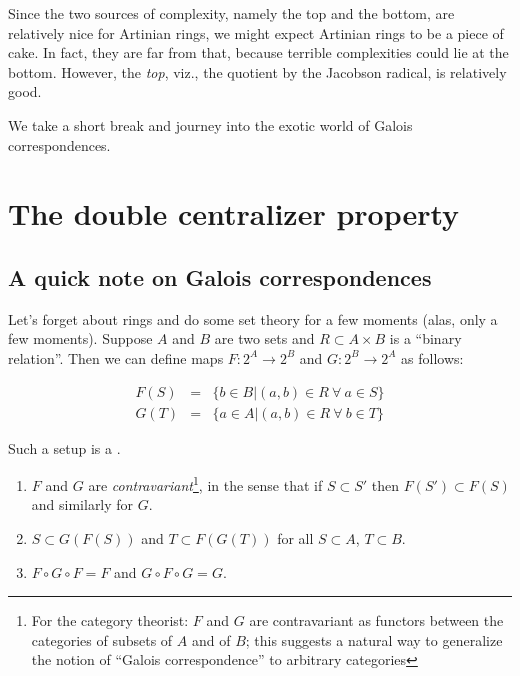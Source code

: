 \documentclass[a4paper]{amsart}
\begin{document}
Since the two sources of complexity, namely the top and the bottom,
are relatively nice for Artinian rings, we might expect Artinian rings
to be a piece of cake. In fact, they are far from that, because
terrible complexities could lie at the bottom. However, the {\em top},
viz., the quotient by the Jacobson radical, is relatively good.

We take a short break and journey into the exotic world of Galois
correspondences.
\section{The double centralizer property}

\subsection{A quick note on Galois correspondences}

Let's forget about rings and do some set theory for a few moments
(alas, only a few moments). Suppose $A$ and $B$ are two sets and $R
\subset A \times B$ is a ``binary relation''. Then we can define maps
$F:2^A \to 2^B$ and $G:2^B \to 2^A$ as follows:

\begin{eqnarray*}
  F(S) & = & \{ b \in B | (a,b) \in R \ \forall \ a \in S \}\\
  G(T) & = & \{ a \in A | (a,b) \in R \ \forall \ b \in T \}
\end{eqnarray*}

Such a setup is a .

\begin{theorem}
  \begin{enumerate}

  \item $F$ and $G$ are {\em contravariant}\footnote{For the category
      theorist: $F$ and $G$ are contravariant as functors between the
      categories of subsets of $A$ and of $B$; this suggests a natural
      way to generalize the notion of ``Galois correspondence'' to
      arbitrary categories}, in the sense that if $S \subset S'$ then
    $F(S') \subset F(S)$ and similarly for $G$.

  \item $S \subset G(F(S))$ and $T \subset F(G(T))$ for all $S \subset
    A$, $T \subset B$.

  \item $F \circ G \circ F = F$ and $G \circ F \circ G = G$.
  \end{enumerate}
\end{theorem}
\end{document}
